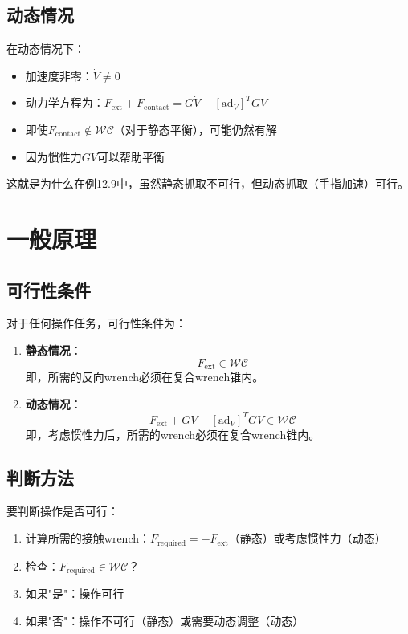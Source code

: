 \documentclass[12pt,a4paper]{article}
\begin{document}
\subsection{动态情况}

在动态情况下：
\begin{itemize}
    \item 加速度非零：$\dot{V} \neq 0$
    \item 动力学方程为：$F_{\text{ext}} + F_{\text{contact}} = G \dot{V} - [\text{ad}_V]^T G V$
    \item 即使$F_{\text{contact}} \notin \mathcal{WC}$（对于静态平衡），可能仍然有解
    \item 因为惯性力$G \dot{V}$可以帮助平衡
\end{itemize}

这就是为什么在例12.9中，虽然静态抓取不可行，但动态抓取（手指加速）可行。

\section{一般原理}

\subsection{可行性条件}

对于任何操作任务，可行性条件为：

\begin{enumerate}
    \item \textbf{静态情况}：
    \begin{equation}
    -F_{\text{ext}} \in \mathcal{WC}
    \end{equation}
    即，所需的反向wrench必须在复合wrench锥内。
    
    \item \textbf{动态情况}：
    \begin{equation}
    -F_{\text{ext}} + G \dot{V} - [\text{ad}_V]^T G V \in \mathcal{WC}
    \end{equation}
    即，考虑惯性力后，所需的wrench必须在复合wrench锥内。
\end{enumerate}

\subsection{判断方法}

要判断操作是否可行：

\begin{enumerate}
    \item 计算所需的接触wrench：$F_{\text{required}} = -F_{\text{ext}}$（静态）或考虑惯性力（动态）
    \item 检查：$F_{\text{required}} \in \mathcal{WC}$？
    \item 如果"是"：操作可行
    \item 如果"否"：操作不可行（静态）或需要动态调整（动态）
\end{enumerate}
\end{document}
